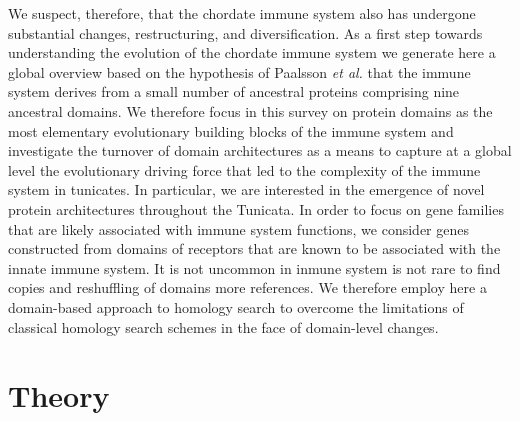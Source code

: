 \documentclass[11pt]{article}
\newcommand{\TODO}[1]{\begingroup\color{red}#1\endgroup}
\begin{document}
We suspect, therefore, that the chordate immune system also has undergone
substantial changes, restructuring, and diversification. As a first step
towards understanding the evolution of the chordate immune system we
generate here a global overview based on the hypothesis of Paalsson \emph{et
  al.} \cite{paalsson2007building} that the immune system derives from a
small number of ancestral proteins comprising nine ancestral domains.  We
therefore focus in this survey on protein domains as the most elementary
evolutionary building blocks of the immune system and investigate the
turnover of domain architectures as a means to capture at a global level
the evolutionary driving force that led to the complexity of the immune
system in tunicates. In particular, we are interested in the emergence of
novel protein architectures throughout the Tunicata. In order to focus on
gene families that are likely associated with immune system functions, we
consider genes constructed from domains of receptors that are known to be
associated with the innate immune system. It is not uncommon in inmune
system is not rare to find copies and reshuffling of domains
\cite{Forslund2012} \TODO{more references}. We therefore employ here a
domain-based approach to homology search to overcome the limitations of
classical homology search schemes in the face of domain-level changes.

\section*{Theory}
\end{document}
